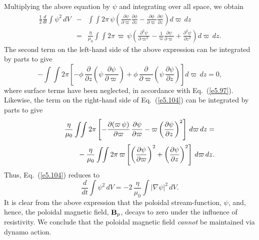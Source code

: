 Multiplying the above equation by $\psi$ and integrating over all space,
we obtain
\begin{eqnarray}\label{e5.104}
\frac{1}{2}\frac{d}{dt}\!\int\psi^2\,dV& -&\int\!\!\int 2\pi\,\psi\left(\frac{\partial\psi}{\partial\varpi}\frac{\partial\phi}{\partial z}
-\frac{\partial\phi}{\partial\varpi}\frac{\partial\psi}{\partial z}\right) d\varpi
\,dz\\[0.5ex]
 &=&\frac{\eta}{\mu_0}\int\!\!\int2\pi\,\varpi\,\psi\left(\frac{\partial^2\psi}{\partial\varpi^2}
-\frac{1}{\varpi}\frac{\partial\psi}{\partial\varpi}
+\frac{\partial^2\psi}{\partial z^2}\right)d\varpi\,dz.\nonumber
\end{eqnarray}
The second term on the left-hand side of the above expression
can be integrated by parts to give
\begin{equation}
-\int\!\!\int 2\pi\left[-\phi\,\frac{\partial}{\partial z}\!
\left(\psi\,\frac{\partial\psi}{\partial\varpi}\right)
+\phi\,\frac{\partial}{\partial \varpi}\!\left(\psi\,\frac{\partial\psi}{\partial z}
\right)\right] d\varpi\,dz=0,
\end{equation}
where surface terms have been neglected, in  accordance with Eq.~(\ref{e5.97}).
Likewise, the term on the right-hand side of Eq.~(\ref{e5.104}) can be integrated by
parts to give
\begin{eqnarray}
\frac{\eta}{\mu_0}\int\!\!\int 2\pi\left[-\frac{\partial(\varpi\,\psi)}{\partial\varpi}
\,\frac{\partial\psi}{\partial\varpi} - \varpi\left(\frac{\partial\psi}
{\partial z}\right)^2\right]\,d\varpi\,d z=&&\nonumber\\[0.5ex]
\mbox{\hspace{2cm}}-\frac{\eta}{\mu_0}\int\!\!\int 2\pi\,
\varpi\left[\left(\frac{\partial\psi}{\partial\varpi}\right)^2
+\left(\frac{\partial\psi}{\partial z}\right)^2\right]\,d\varpi\,dz.&&
\end{eqnarray}
Thus, Eq.~(\ref{e5.104}) reduces to
\begin{equation}
\frac{d}{dt}\!\int\psi^2\,dV = -2\,\frac{\eta}{\mu_0}\int |\nabla\psi|^2\,dV.
\end{equation}
It is clear from the above expression that the poloidal stream-function, $\psi$,
and, hence, the poloidal magnetic field, ${\bf B}_p$, decays to zero
under the influence of resistivity. We conclude that the poloidal magnetic
field {\em cannot} be maintained via dynamo action.

